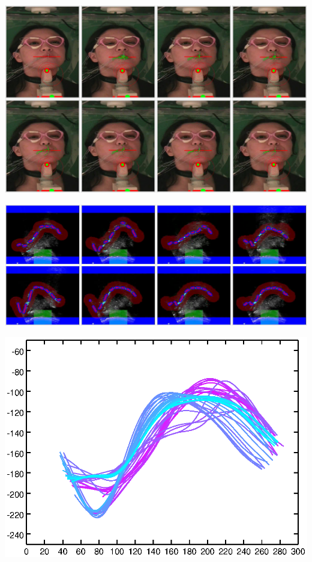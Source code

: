 \documentclass{ContactProject}
\begin{document}
\begin{center}

\includegraphics[width=\textwidth]{images/mouth-example}

\includegraphics[width=\textwidth]{images/tongue-example}

\includegraphics[width=\textwidth]{images/tongue-over-time}  


\end{center}
\end{document}
